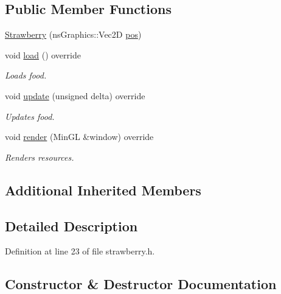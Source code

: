 \subsection*{Public Member Functions}
\begin{DoxyCompactItemize}
\item 
\hyperlink{classns_game_1_1_strawberry_abeb99e75e7bf444bb88973492a5266db}{Strawberry} (ns\+Graphics\+::\+Vec2D \hyperlink{structns_game_1_1_item_a5518876a13f3d2eda659d29748097f1a}{pos})
\item 
void \hyperlink{classns_game_1_1_strawberry_a0db46752979078f7bc64703425887ff5}{load} () override
\begin{DoxyCompactList}\small\item\em Loads food. \end{DoxyCompactList}\item 
void \hyperlink{classns_game_1_1_strawberry_a67f6d787f200bc7202b4ede2bde2b9ac}{update} (unsigned delta) override
\begin{DoxyCompactList}\small\item\em Updates food. \end{DoxyCompactList}\item 
void \hyperlink{classns_game_1_1_strawberry_a7d4b1b56782cdca38e37a0ea254f7dc5}{render} (Min\+GL \&window) override
\begin{DoxyCompactList}\small\item\em Renders resources. \end{DoxyCompactList}\end{DoxyCompactItemize}
\subsection*{Additional Inherited Members}


\subsection{Detailed Description}


Definition at line 23 of file strawberry.\+h.



\subsection{Constructor \& Destructor Documentation}
\mbox{\label{classns_game_1_1_strawberry_abeb99e75e7bf444bb88973492a5266db}} 
